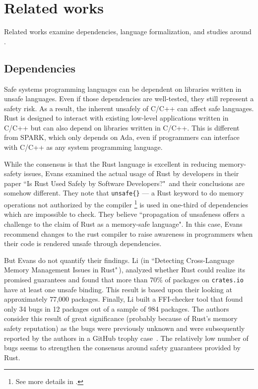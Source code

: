 \documentclass[nomenclature, english, bibtex]{kththesis}
\begin{document}
\cleardoublepage

\chapter{Related works}
\label{ch:relatedworks}

Related works examine dependencies, language formalization, and studies around .

\section{Dependencies}
\label{subsec:dependencies}

Safe systems programming languages can be dependent on libraries written in unsafe languages. Even if those dependencies are well-tested, they still represent a safety risk. As a result, the inherent unsafely of C/C++ can affect safe languages. Rust is designed to interact with existing low-level applications written in C/C++ but can also depend on libraries written in C/C++. This is different from SPARK, which only depends on Ada, even if programmers can interface with C/C++ as any system programming language.

While the consensus is that the Rust language is excellent in reducing memory-safety issues, Evans \etal examined the actual usage of Rust by developers in their paper ``Is Rust Used Safely by Software Developers?"\,\cite{evans_is_2020} and their conclusions are somehow different. They note that \texttt{unsafe\{\}} --- a Rust keyword to do memory operations not authorized by the compiler \footnote{See more details in .} is used in one-third of dependencies which are impossible to check. They believe ``propagation of unsafeness offers a challenge to the claim of Rust as a memory-safe language". In this case, Evans \etal recommend changes to the rust compiler to raise awareness in programmers when their code is rendered unsafe through dependencies. 

But Evans \etal do not quantify their findings. Li \etal (in ``Detecting Cross-Language Memory Management Issues in Rust"\,\cite{li_detecting_2022}), analyzed whether  Rust could realize its promised guarantees and found that more than 70\% of packages on \texttt{crates.io} have at least one unsafe binding. This result is based upon their looking at approximately 77,000 packages. Finally, Li \etal built a \gls{FFI}-checker tool that found only 34 bugs in 12 packages out of a sample of 984 packages. The authors consider this result of great significance (probably because of Rust's memory safety reputation) as the bugs were previously unknown and were subsequently reported by the authors in a GitHub trophy case \,\cite{li_rust-ffi-checkertrophy-case_nodate}. The relatively low number of bugs seems to strengthen the consensus around safety guarantees provided by Rust.
\end{document}
